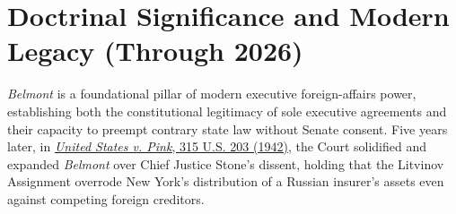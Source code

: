 \documentclass[12pt]{article}
\begin{document}
\section{Doctrinal Significance and Modern Legacy (Through 2026)}

\textit{Belmont} is a foundational pillar of modern executive foreign-affairs power, establishing both the constitutional legitimacy of sole executive agreements and their capacity to preempt contrary state law without Senate consent. Five years later, in \href{https://supreme.justia.com/cases/federal/us/315/203/}{\textit{United States v. Pink}, 315 U.S. 203 (1942)}, the Court solidified and expanded \textit{Belmont} over Chief Justice Stone's dissent, holding that the Litvinov Assignment overrode New York's distribution of a Russian insurer's assets even against competing foreign creditors.
\end{document}
